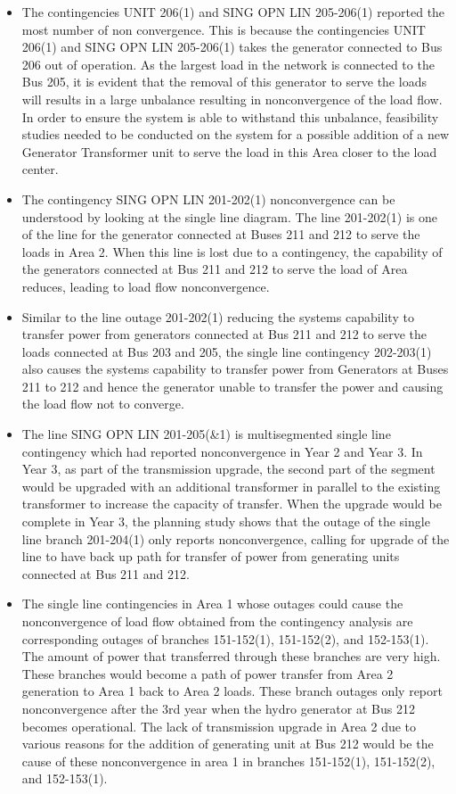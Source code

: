 \documentclass[10pt]{report}
\begin{document}
\begin{itemize}
\item The contingencies UNIT 206(1) and SING OPN LIN 205-206(1) reported the most number of non convergence. This is because the contingencies UNIT 206(1) and SING OPN LIN 205-206(1) takes the generator connected to Bus 206 out of operation. As the largest load in the network is connected to the Bus 205, it is evident that the removal of this generator to serve the loads will results in a large unbalance resulting in nonconvergence of the load flow. 
In order to ensure the system is able to withstand this unbalance, feasibility studies needed to be conducted on the system for a possible addition of a new Generator Transformer unit to serve the load in this Area closer to the load center. 
\item The contingency SING OPN LIN 201-202(1) nonconvergence can be understood by looking at the single line diagram. The line 201-202(1) is one of the line for the generator connected at Buses 211 and 212 to serve the loads in Area 2. When this line is lost due to a contingency, the capability of the generators connected at Bus 211 and 212 to serve the load of Area reduces, leading to load flow nonconvergence. 
\item Similar to the line outage 201-202(1) reducing the systems capability to transfer power from generators connected at Bus 211 and 212 to serve the loads connected at Bus 203 and 205, the single line contingency 202-203(1) also causes the systems capability to transfer power from Generators at Buses 211 to 212 and hence the generator unable to transfer the power and causing the load flow not to converge. 
\item The line SING OPN LIN 201-205(\&1) is multisegmented single line contingency which had reported nonconvergence in Year 2 and Year 3. In Year 3, as part of the transmission upgrade, the second part of the segment would be upgraded with an additional transformer in parallel to the existing transformer to increase the capacity of transfer. When the upgrade would be complete in Year 3, the planning study shows that the outage of the single line branch 201-204(1) only reports nonconvergence, calling for upgrade of the line to have back up path for transfer of power from generating units connected at Bus 211 and 212. 
\item The single line contingencies in Area 1 whose outages could cause the nonconvergence of load flow obtained from the contingency analysis are corresponding outages of branches 151-152(1), 151-152(2), and 152-153(1). The amount of power that transferred through these branches are very high. These branches would become a path of power transfer from Area 2 generation to Area 1 back to Area 2 loads. These branch outages only report nonconvergence after the 3rd year when the hydro generator at Bus 212 becomes operational. The lack of transmission upgrade in Area 2 due to various reasons for the addition of generating unit at Bus 212 would be the cause of these nonconvergence in area 1 in branches 151-152(1), 151-152(2), and 152-153(1). 

\end{itemize}
\end{document}
